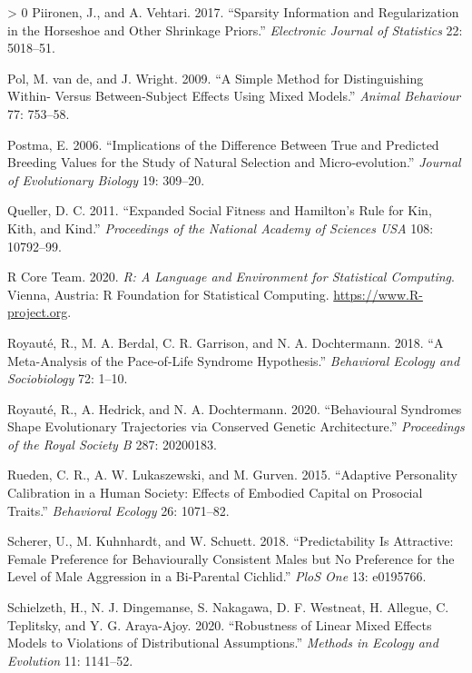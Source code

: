 \documentclass{article}
\newlength{\cslhangindent}
\newenvironment{CSLReferences}[3] %
 {%
  \setlength{\parindent}{0pt}
  \ifodd #1 \everypar{\setlength{\hangindent}{\cslhangindent}}\ignorespaces\fi
  \ifnum #2 > 0
  \setlength{\parskip}{#2\baselineskip}
  \fi
 }%
 {}
\begin{document}
\begin{CSLReferences}{1}{0}
\leavevmode\hypertarget{ref-Piir2017}{}%
Piironen, J., and A. Vehtari. 2017. {``Sparsity Information and
Regularization in the Horseshoe and Other Shrinkage Priors.''}
\emph{Electronic Journal of Statistics} 22: 5018--51.

\leavevmode\hypertarget{ref-Pol2009}{}%
Pol, M. van de, and J. Wright. 2009. {``A Simple Method for
Distinguishing Within- Versus Between-Subject Effects Using Mixed
Models.''} \emph{Animal Behaviour} 77: 753--58.

\leavevmode\hypertarget{ref-Postma2006}{}%
Postma, E. 2006. {``Implications of the Difference Between True and
Predicted Breeding Values for the Study of Natural Selection and
Micro‐evolution.''} \emph{Journal of Evolutionary Biology} 19: 309--20.

\leavevmode\hypertarget{ref-Queller2011}{}%
Queller, D. C. 2011. {``Expanded Social Fitness and Hamilton's Rule for
Kin, Kith, and Kind.''} \emph{Proceedings of the National Academy of
Sciences USA} 108: 10792--99.

\leavevmode\hypertarget{ref-Rbase}{}%
R Core Team. 2020. \emph{R: A Language and Environment for Statistical
Computing}. Vienna, Austria: R Foundation for Statistical Computing.
\url{https://www.R-project.org}.

\leavevmode\hypertarget{ref-Roy2018}{}%
Royauté, R., M. A. Berdal, C. R. Garrison, and N. A. Dochtermann. 2018.
{``A Meta-Analysis of the Pace-of-Life Syndrome Hypothesis.''}
\emph{Behavioral Ecology and Sociobiology} 72: 1--10.

\leavevmode\hypertarget{ref-Roy2020}{}%
Royauté, R., A. Hedrick, and N. A. Dochtermann. 2020. {``Behavioural
Syndromes Shape Evolutionary Trajectories via Conserved Genetic
Architecture.''} \emph{Proceedings of the Royal Society B} 287:
20200183.

\leavevmode\hypertarget{ref-Rueden2015}{}%
Rueden, C. R., A. W. Lukaszewski, and M. Gurven. 2015. {``Adaptive
Personality Calibration in a Human Society: Effects of Embodied Capital
on Prosocial Traits.''} \emph{Behavioral Ecology} 26: 1071--82.

\leavevmode\hypertarget{ref-Scherer2018}{}%
Scherer, U., M. Kuhnhardt, and W. Schuett. 2018. {``Predictability Is
Attractive: Female Preference for Behaviourally Consistent Males but No
Preference for the Level of Male Aggression in a Bi-Parental Cichlid.''}
\emph{PloS One} 13: e0195766.

\leavevmode\hypertarget{ref-Schiel2020}{}%
Schielzeth, H., N. J. Dingemanse, S. Nakagawa, D. F. Westneat, H.
Allegue, C. Teplitsky, and Y. G. Araya-Ajoy. 2020. {``Robustness of
Linear Mixed Effects Models to Violations of Distributional
Assumptions.''} \emph{Methods in Ecology and Evolution} 11: 1141--52.


\end{CSLReferences}
\end{document}
